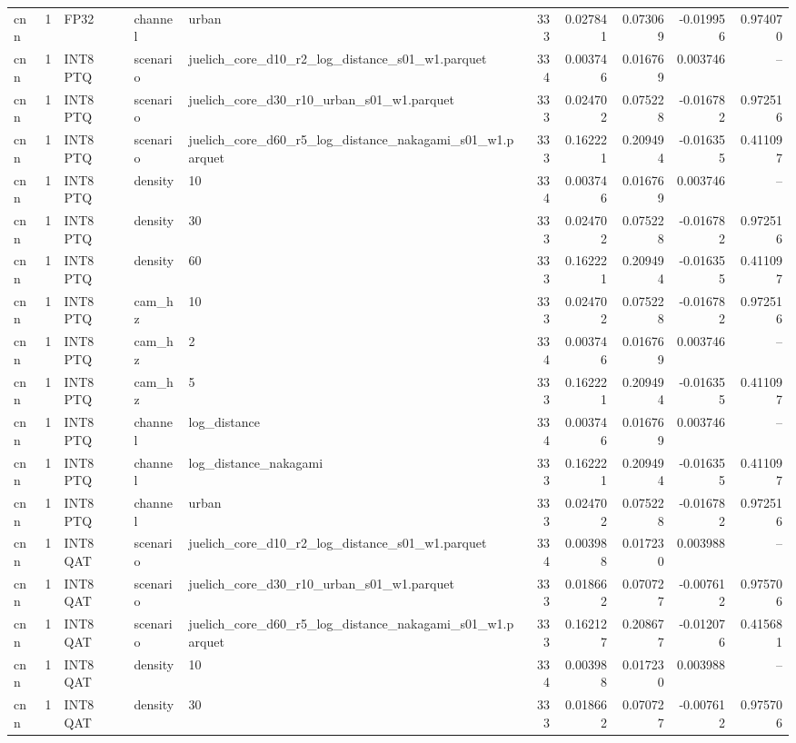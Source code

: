 \begin{tabular}{lrlllrrrrr}
cnn & 1 & FP32 & channel & urban & 333 & 0.027841 & 0.073069 & -0.019956 & 0.974070 \\
cnn & 1 & INT8 PTQ & scenario & juelich\_core\_d10\_r2\_log\_distance\_s01\_w1.parquet & 334 & 0.003746 & 0.016769 & 0.003746 & -- \\
cnn & 1 & INT8 PTQ & scenario & juelich\_core\_d30\_r10\_urban\_s01\_w1.parquet & 333 & 0.024702 & 0.075228 & -0.016782 & 0.972516 \\
cnn & 1 & INT8 PTQ & scenario & juelich\_core\_d60\_r5\_log\_distance\_nakagami\_s01\_w1.parquet & 333 & 0.162221 & 0.209494 & -0.016355 & 0.411097 \\
cnn & 1 & INT8 PTQ & density & 10 & 334 & 0.003746 & 0.016769 & 0.003746 & -- \\
cnn & 1 & INT8 PTQ & density & 30 & 333 & 0.024702 & 0.075228 & -0.016782 & 0.972516 \\
cnn & 1 & INT8 PTQ & density & 60 & 333 & 0.162221 & 0.209494 & -0.016355 & 0.411097 \\
cnn & 1 & INT8 PTQ & cam\_hz & 10 & 333 & 0.024702 & 0.075228 & -0.016782 & 0.972516 \\
cnn & 1 & INT8 PTQ & cam\_hz & 2 & 334 & 0.003746 & 0.016769 & 0.003746 & -- \\
cnn & 1 & INT8 PTQ & cam\_hz & 5 & 333 & 0.162221 & 0.209494 & -0.016355 & 0.411097 \\
cnn & 1 & INT8 PTQ & channel & log\_distance & 334 & 0.003746 & 0.016769 & 0.003746 & -- \\
cnn & 1 & INT8 PTQ & channel & log\_distance\_nakagami & 333 & 0.162221 & 0.209494 & -0.016355 & 0.411097 \\
cnn & 1 & INT8 PTQ & channel & urban & 333 & 0.024702 & 0.075228 & -0.016782 & 0.972516 \\
cnn & 1 & INT8 QAT & scenario & juelich\_core\_d10\_r2\_log\_distance\_s01\_w1.parquet & 334 & 0.003988 & 0.017230 & 0.003988 & -- \\
cnn & 1 & INT8 QAT & scenario & juelich\_core\_d30\_r10\_urban\_s01\_w1.parquet & 333 & 0.018662 & 0.070727 & -0.007612 & 0.975706 \\
cnn & 1 & INT8 QAT & scenario & juelich\_core\_d60\_r5\_log\_distance\_nakagami\_s01\_w1.parquet & 333 & 0.162127 & 0.208677 & -0.012076 & 0.415681 \\
cnn & 1 & INT8 QAT & density & 10 & 334 & 0.003988 & 0.017230 & 0.003988 & -- \\
cnn & 1 & INT8 QAT & density & 30 & 333 & 0.018662 & 0.070727 & -0.007612 & 0.975706 \\

\end{tabular}
